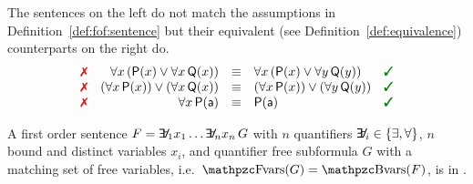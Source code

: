 \begin{example}The sentences on the left do not match
	the assumptions in Definition~\vref{def:fof:sentence}
	but their {equivalent (see Definition~\vref{def:equivalence})}
	counterparts on the right do.
	\[
	\begin{array}{rrcll}
		 \text{\color{colLo}{\xmark}}
		& \forall x\, ({\mP(x) \lor \forall x\, {\mQ(x)}})
		& {\equiv}
		& \forall x\, ({\mP(x) \lor \forall y\, {\mQ(y)}})
		& \text{\color{colHi}{\cmark}}
		\\ \text{\color{colLo}{\xmark}}
		& (\forall x\, {\mP(x)}) \lor (\forall x\, {\mQ(x)})
		& {\equiv}
		& (\forall x\, {\mP(x)}) \lor (\forall y\, {\mQ(y)})
		& \text{\color{colHi}{\cmark}}
		\\
		\text{\color{colLo}{\xmark}}
		&  \forall x\, {\mP(\ma)}
		& {\equiv}
		& \mP(\ma)
		& \text{\color{colHi}{\cmark}}
	\end{array}
	\]

\end{example}

\begin{definition}[\PNF]
	A first order sentence \( F = \quantify_1 x_1 \ldots \quantify_n x_n\, G \)
	with \( n \) quantifiers \( \quantify_i \in \{ \exists, \forall \} \),
	\( n \) bound and distinct variables \( x_i \),
	and quantifier free subformula \( G \) with
	a matching set of free variables, i.e.~\( \fvar(G) = \bvar(F) \),
	is in .
\end{definition}


